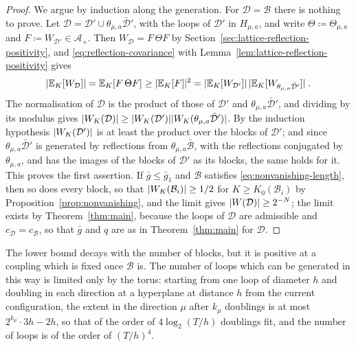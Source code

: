 \documentclass[11pt]{preprint}
\DeclarePairedDelimiter{\abs}{\lvert}{\rvert}
\numberwithin{equation}{section}
\theoremstyle{definition}
\theoremstyle{remark}
\theoremstyle{plain}
\begin{document}
\begin{proof}
We argue by induction along the generation. For $\mathcal D = \mathcal B$ there is nothing to prove. Let $\mathcal D = \mathcal D' \cup \theta_{\mu,a}\bar{\mathcal D}'$, with the loops of $\mathcal D'$ in $H_{\mu,a}$, and write $\Theta \coloneqq \Theta_{\mu,a}$ and $F \coloneqq W_{\mathcal D'} \in \mathcal A_+$. Then $W_{\mathcal D} = F\,\Theta F$ by Section~\ref{sec:lattice-reflection-positivity}, and \eqref{eq:reflection-covariance} with Lemma~\ref{lem:lattice-reflection-positivity} gives
\begin{equation}\label{eq:doubling-inequality}
    \abs{\mathbb E_K[W_{\mathcal D}]} = \mathbb E_K[F\,\Theta F] \geq \abs{\mathbb E_K[F]}^2 = \abs{\mathbb E_K[W_{\mathcal D'}]}\,\abs{\mathbb E_K[W_{\theta_{\mu,a}\bar{\mathcal D}'}]}\;.
\end{equation}
The normalisation of $\mathcal D$ is the product of those of $\mathcal D'$ and $\theta_{\mu,a}\bar{\mathcal D}'$, and dividing by its modulus gives $\abs{W_K(\mathcal D)} \geq \abs{W_K(\mathcal D')}\abs{W_K(\theta_{\mu,a}\bar{\mathcal D}')}$. By the induction hypothesis $\abs{W_K(\mathcal D')}$ is at least the product over the blocks of $\mathcal D'$; and since $\theta_{\mu,a}\bar{\mathcal D}'$ is generated by reflections from $\theta_{\mu,a}\bar{\mathcal B}$, with the reflections conjugated by $\theta_{\mu,a}$, and has the images of the blocks of $\mathcal D'$ as its blocks, the same holds for it. This proves the first assertion. If $\bar g \leq \bar g_1$ and $\mathcal B$ satisfies \eqref{eq:nonvanishing-length}, then so does every block, so that $\abs{W_K(\mathcal B_i)} \geq 1/2$ for $K \geq K_0(\mathcal B_i)$ by Proposition~\ref{prop:nonvanishing}, and the limit gives $\abs{W(\mathcal D)} \geq 2^{-N}$; the limit exists by Theorem~\ref{thm:main}, because the loops of $\mathcal D$ are admissible and $c_{\mathcal D} = c_{\mathcal B}$, so that $\bar g$ and $q$ are as in Theorem~\ref{thm:main} for $\mathcal D$.
\end{proof}

The lower bound decays with the number of blocks, but it is positive at a coupling which is fixed once $\mathcal B$ is. The number of loops which can be generated in this way is limited only by the torus: starting from one loop of diameter $h$ and doubling in each direction at a hyperplane at distance $h$ from the current configuration, the extent in the direction $\mu$ after $k_\mu$ doublings is at most $2^{k_\mu}\cdot3h - 2h$, so that of the order of $4\log_2(T/h)$ doublings fit, and the number of loops is of the order of $(T/h)^4$.
\end{document}
